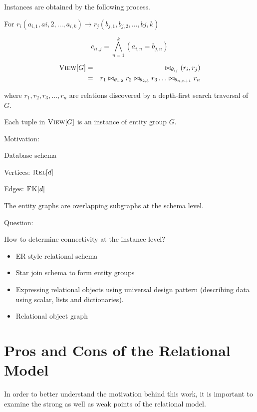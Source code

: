 		Instances are obtained by the following process.
		
		For $r_i(a_{i, 1}, a{i, 2}, \ldots, a_{i, k}) \rightarrow r_j(b_{j, 1}, b_{j, 2}, \ldots, b{j, k})$
		
		$$c_{ii, j} = \bigwedge^k_{n=1} (a_{i, n} = b_{j, n})$$
		
		\begin{eqnarray*}
			\textsc{View}\lbrack G\rbrack &=& \bowtie_{\theta_{ij}} (r_i, r_j) \\
			&=& r_1 \bowtie_{\theta_{1, 2}} r_2 \bowtie_{\theta_{2, 3}} r_3 \ldots \bowtie_{\theta_{n, n+1}} r_n
		\end{eqnarray*}
		
		where $r_1, r_2, r_3, \ldots, r_n$ are relations discovered by a depth-first search traversal of $G$.
		
		Each tuple in $\textsc{View}\lbrack G\rbrack$ is an instance of entity group $G$.
		
		Motivation:
		
		
		Database schema
		
		Vertices:  $\textsc{Rel}\lbrack d\rbrack$
		
		Edges:  $\textsc{FK}\lbrack d\rbrack$
		
		The entity graphs are overlapping subgraphs at the schema level.
		
		Question:
		
		How to determine connectivity at the instance level?
	
	\begin{itemize}
		\item ER style relational schema
		\item Star join schema to form entity groups
		\item Expressing relational objects using universal design pattern (describing data using scalar, lists and dictionaries).
		\item Relational object graph
	\end{itemize}

\section{Pros and Cons of the Relational Model}
	In order to better understand the motivation behind this work, it is important to examine the strong as well as weak points of the relational model.
	
